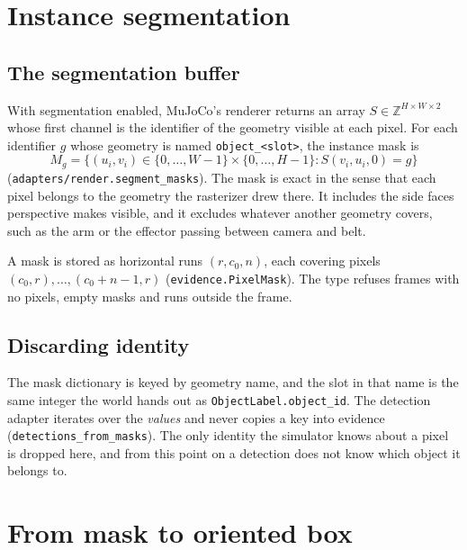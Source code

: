 \documentclass[11pt,a4paper]{article}
\theoremstyle{definition}
\theoremstyle{remark}
\newcommand{\code}[1]{\texttt{#1}}
\begin{document}
\section{Instance segmentation}
\label{sec:segmentation}

\subsection{The segmentation buffer}

With segmentation enabled, MuJoCo's renderer returns an array
$S\in\mathbb{Z}^{H\times W\times 2}$ whose first channel is the identifier of the
geometry visible at each pixel. For each identifier $g$ whose geometry is named
\code{object\_<slot>}, the instance mask is
\begin{equation}
M_g = \{(u_i, v_i)\in\{0,\dots,W-1\}\times\{0,\dots,H-1\} : S(v_i,u_i,0) = g\}
\end{equation}
(\code{adapters/render.segment\_masks}). The mask is exact in the sense that
each pixel belongs to the geometry the rasterizer drew there. It includes the
side faces perspective makes visible, and it excludes whatever another geometry
covers, such as the arm or the effector passing between camera and belt.

A mask is stored as horizontal runs $(r, c_0, n)$, each covering pixels
$(c_0,r),\dots,(c_0+n-1,r)$ (\code{evidence.PixelMask}). The type refuses frames
with no pixels, empty masks and runs outside the frame.

\subsection{Discarding identity}

The mask dictionary is keyed by geometry name, and the slot in that name is the
same integer the world hands out as \code{ObjectLabel.object\_id}. The detection
adapter iterates over the \emph{values} and never copies a key into evidence
(\code{detections\_from\_masks}). The only identity the simulator knows about a
pixel is dropped here, and from this point on a detection does not know which
object it belongs to.

\section{From mask to oriented box}
\label{sec:moments}
\end{document}
